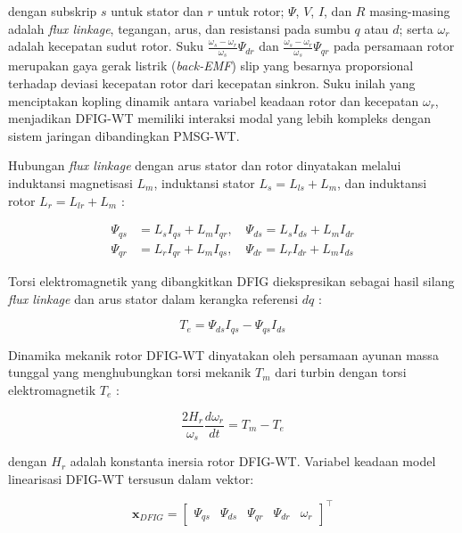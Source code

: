 dengan subskrip $s$ untuk stator dan $r$ untuk rotor; $\Psi$, $V$, $I$, dan $R$
masing-masing adalah \textit{flux linkage}, tegangan, arus, dan resistansi pada
sumbu $q$ atau $d$; serta $\omega_r$ adalah kecepatan sudut rotor. Suku
$\frac{\omega_s - \omega_r}{\omega_s}\Psi_{dr}$ dan
$\frac{\omega_s - \omega_r}{\omega_s}\Psi_{qr}$ pada persamaan rotor merupakan
gaya gerak listrik (\textit{back-EMF}) slip yang besarnya proporsional terhadap
deviasi kecepatan rotor dari kecepatan sinkron. Suku inilah yang menciptakan
kopling dinamik antara variabel keadaan rotor dan kecepatan $\omega_r$, menjadikan
DFIG-WT memiliki interaksi modal yang lebih kompleks dengan sistem jaringan
dibandingkan PMSG-WT.

Hubungan \textit{flux linkage} dengan arus stator dan rotor dinyatakan melalui
induktansi magnetisasi $L_m$, induktansi stator $L_s = L_{ls} + L_m$, dan
induktansi rotor $L_r = L_{lr} + L_m$ \cite{mehta2014}:

\begin{align}
  \Psi_{qs} &= L_s I_{qs} + L_m I_{qr}, \quad
  \Psi_{ds} = L_s I_{ds} + L_m I_{dr} \label{eq:dfig-psi-stator} \\[4pt]
  \Psi_{qr} &= L_r I_{qr} + L_m I_{qs}, \quad
  \Psi_{dr} = L_r I_{dr} + L_m I_{ds} \label{eq:dfig-psi-rotor}
\end{align}

Torsi elektromagnetik yang dibangkitkan DFIG diekspresikan sebagai hasil silang
\textit{flux linkage} dan arus stator dalam kerangka referensi $dq$ \cite{mehta2014}:

\begin{equation}
  T_e = \Psi_{ds} I_{qs} - \Psi_{qs} I_{ds}
  \label{eq:dfig-Te}
\end{equation}

Dinamika mekanik rotor DFIG-WT dinyatakan oleh persamaan ayunan massa tunggal
yang menghubungkan torsi mekanik $T_m$ dari turbin dengan torsi elektromagnetik
$T_e$ \cite{mehta2014}:

\begin{equation}
  \frac{2H_r}{\omega_s}\frac{d\omega_r}{dt} = T_m - T_e
  \label{eq:dfig-omega}
\end{equation}

dengan $H_r$ adalah konstanta inersia rotor DFIG-WT. Variabel keadaan model linearisasi DFIG-WT tersusun dalam vektor:

\begin{equation}
  \mathbf{x}_{DFIG} =
  \begin{bmatrix}\Psi_{qs} & \Psi_{ds} & \Psi_{qr} & \Psi_{dr} & \omega_r\end{bmatrix}^\top
  \label{eq:dfig-statevec}
\end{equation}

